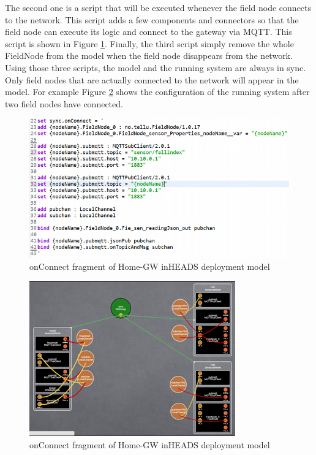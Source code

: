 The second one is a script that will be executed whenever the field node connects to the network. This script adds a few components and connectors so that the field node can execute its logic and connect to the gateway via MQTT. This script is shown in Figure \ref{fig:fig7}. 
Finally, the third script simply remove the whole FieldNode from the model when the field node disappears from the network. Using those three scripts, the model and the running system are always in sync. Only field nodes that are actually connected to the network will appear in the model. For example Figure \ref{fig:fig8} shows the configuration of the running system after two field nodes have connected. 

\begin{figure}[h]
	\centering
	\includegraphics[width=1\linewidth]{figures/fig7}
	\caption{onConnect fragment of Home-GW inHEADS deployment model}
	\label{fig:fig7}
\end{figure}


\begin{figure}[h]
	\centering
	\includegraphics[width=1\linewidth]{figures/fig8}
	\caption{onConnect fragment of Home-GW inHEADS deployment model}
	\label{fig:fig8}
\end{figure}

